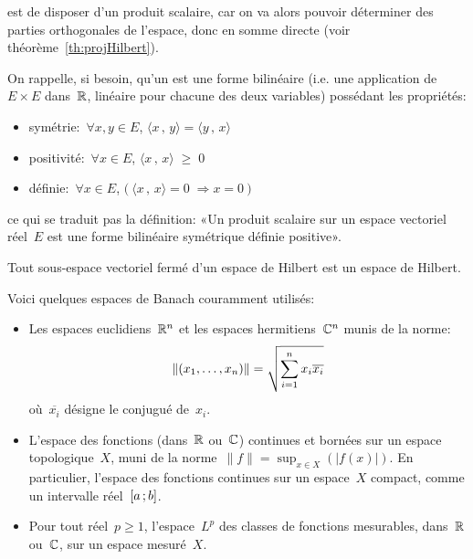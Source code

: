 \medskip
{} est de disposer d'un produit scalaire, car on va alors pouvoir déterminer des parties orthogonales de l'espace, donc en somme directe (voir théorème~\ref{th:projHilbert}).

	On rappelle, si besoin, qu'un  est une forme bilinéaire (i.e. une application de~$E\times E$ dans~$\mathbb R$, linéaire pour chacune des deux variables) possédant les propriétés:
	\begin{itemize}
	  \item symétrie:~$\forall x,y \in E$, $\langle x\, , \, y \rangle = \langle y\, , \, x\rangle$
	  \item positivité:~$\forall x \in E$, $\langle x\, , \, x \rangle \; \ge \; 0$
	  \item définie:~$\forall x \in E$, $\big(\ \langle x\, , \, x \rangle = 0 \; \Rightarrow x = 0\ \big)$
	\end{itemize}
ce qui se traduit pas la définition: «Un produit scalaire sur un espace vectoriel réel~$E$ est une forme bilinéaire symétrique définie positive».

\medskip
\begin{theoreme}\label{Th-SsH}
Tout sous-espace vectoriel fermé d'un espace de Hilbert est un espace de Hilbert.
\end{theoreme}

\medskip
Voici quelques espaces de Banach couramment utilisés:
\begin{itemize}
\item Les espaces euclidiens~$\mathbb R^n$ et
les espaces hermitiens~$\mathbb C^n$
munis de la norme:
\begin{equation}\|(x_1,\ldots,x_n)\| = \sqrt{\displaystyle\sum_{i=1}^n x_i \overline{x_i}}\end{equation} où~$\overline{x_i}$
désigne le conjugué de~$x_i$.

\item L'espace des fonctions (dans~$\mathbb R$ ou~$\mathbb C$) continues et bornées sur un espace topologique~$X$,
muni de la norme~$\|f\| = \sup_{x \in X}(|f(x)|)$.
En particulier, l'espace des fonctions continues sur un espace~$X$ compact, comme un intervalle réel~$\mathopen{[}a\,;b\mathclose{]}$.

\item Pour tout réel~$p \ge 1$, l'espace~$L^p$ des classes de fonctions mesurables, dans~$\mathbb R$ ou~$\mathbb C$, sur un espace mesuré~$X$.
\end{itemize}

